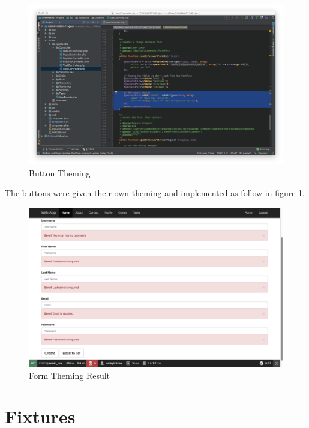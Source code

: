 \begin{figure}[htbp]
   \centering
   \includegraphics[width=400pt]{figures/usercontroller_button.png} %
   \caption{Button Theming}
   \label{fig:Button Theming}
\end{figure}

The buttons were given their own theming and implemented as follow in figure \ref{fig:Button Theming}.

\begin{figure}[htbp]
   \centering
   \includegraphics[width=400pt]{figures/form_theming.png} %
   \caption{Form Theming Result}
   \label{fig:Form Theming Result}
\end{figure}

\section{Fixtures}


